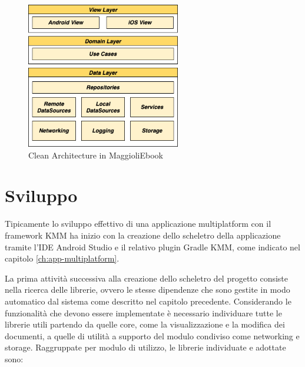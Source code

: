 \begin{figure}[H]
    \centering
    \includegraphics[width=0.6\textwidth]{img/clean-architecture.png}
    \caption{Clean Architecture in MaggioliEbook}
    \label{clean-arch-kmm-fig}
\end{figure}

\section{Sviluppo}
Tipicamente lo sviluppo effettivo di una applicazione multiplatform con il framework KMM ha inizio con la creazione dello scheletro della applicazione tramite l'IDE Android Studio e il relativo plugin Gradle KMM, come indicato nel capitolo \ref{ch:app-multiplatform}.

La prima attività successiva alla creazione dello scheletro del progetto consiste nella ricerca delle librerie, ovvero le stesse dipendenze che sono gestite in modo automatico dal sistema come descritto nel capitolo precedente. Considerando le funzionalità che devono essere implementate è necessario individuare tutte le librerie utili partendo da quelle core, come la visualizzazione e la modifica dei documenti, a quelle di utilità a supporto del modulo condiviso come networking e storage. Raggruppate per modulo di utilizzo, le librerie individuate e adottate sono:

